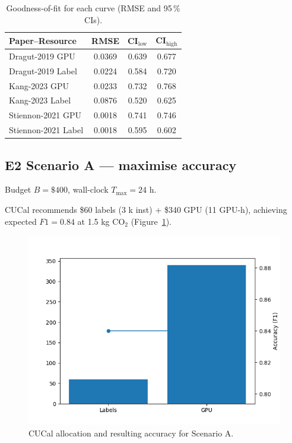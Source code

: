\documentclass[11pt]{article}
\begin{document}
\begin{table}[ht]
  \centering
  \caption{Goodness-of-fit for each curve (RMSE and 95\,\% CIs).}
  \label{tab:rmse}             %
  \begin{tabular}{lccc}
    \toprule
    Paper–Resource            & RMSE  & CI$_\text{low}$ & CI$_\text{high}$ \\
    \midrule
    Dragut-2019 GPU           & 0.0369 & 0.639 & 0.677 \\
    Dragut-2019 Label         & 0.0224 & 0.584 & 0.720 \\
    Kang-2023 GPU             & 0.0233 & 0.732 & 0.768 \\
    Kang-2023 Label           & 0.0876 & 0.520 & 0.625 \\
    Stiennon-2021 GPU         & 0.0018 & 0.741 & 0.746 \\
    Stiennon-2021 Label       & 0.0018 & 0.595 & 0.602 \\
    \bottomrule
  \end{tabular}
\end{table}


\subsection{E2 Scenario A — maximise accuracy}
Budget \(B=\$400\), wall-clock \(T_{\max}=24\) h.

CUCal recommends \$60 labels (3 k inst) + \$340 GPU (11 GPU-h),
achieving expected \(F1=0.84\) at 1.5 kg CO\(_2\)
(Figure~\ref{fig:scenarioA}).

\begin{figure}[htbp]
  \centering
  \includegraphics[width=.75\linewidth]{figures/scenarioA.png}
  \caption{CUCal allocation and resulting accuracy for Scenario A.}
  \label{fig:scenarioA}
\end{figure}
\end{document}
